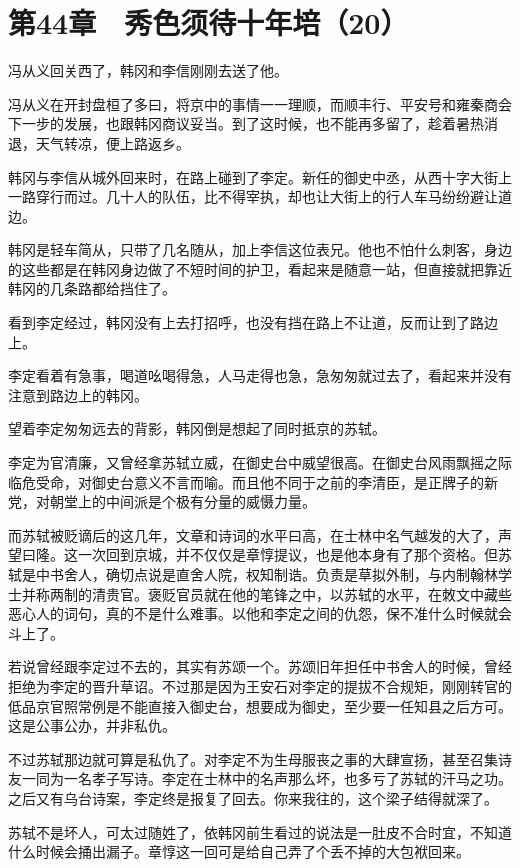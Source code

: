 \section{第44章　秀色须待十年培（20）}

冯从义回关西了，韩冈和李信刚刚去送了他。

冯从义在开封盘桓了多曰，将京中的事情一一理顺，而顺丰行、平安号和雍秦商会下一步的发展，也跟韩冈商议妥当。到了这时候，也不能再多留了，趁着暑热消退，天气转凉，便上路返乡。

韩冈与李信从城外回来时，在路上碰到了李定。新任的御史中丞，从西十字大街上一路穿行而过。几十人的队伍，比不得宰执，却也让大街上的行人车马纷纷避让道边。

韩冈是轻车简从，只带了几名随从，加上李信这位表兄。他也不怕什么刺客，身边的这些都是在韩冈身边做了不短时间的护卫，看起来是随意一站，但直接就把靠近韩冈的几条路都给挡住了。

看到李定经过，韩冈没有上去打招呼，也没有挡在路上不让道，反而让到了路边上。

李定看着有急事，喝道吆喝得急，人马走得也急，急匆匆就过去了，看起来并没有注意到路边上的韩冈。

望着李定匆匆远去的背影，韩冈倒是想起了同时抵京的苏轼。

李定为官清廉，又曾经拿苏轼立威，在御史台中威望很高。在御史台风雨飘摇之际临危受命，对御史台意义不言而喻。而且他不同于之前的李清臣，是正牌子的新党，对朝堂上的中间派是个极有分量的威慑力量。

而苏轼被贬谪后的这几年，文章和诗词的水平曰高，在士林中名气越发的大了，声望曰隆。这一次回到京城，并不仅仅是章惇提议，也是他本身有了那个资格。但苏轼是中书舍人，确切点说是直舍人院，权知制诰。负责是草拟外制，与内制翰林学士并称两制的清贵官。褒贬官员就在他的笔锋之中，以苏轼的水平，在敇文中藏些恶心人的词句，真的不是什么难事。以他和李定之间的仇怨，保不准什么时候就会斗上了。

若说曾经跟李定过不去的，其实有苏颂一个。苏颂旧年担任中书舍人的时候，曾经拒绝为李定的晋升草诏。不过那是因为王安石对李定的提拔不合规矩，刚刚转官的低品京官照常例是不能直接入御史台，想要成为御史，至少要一任知县之后方可。这是公事公办，并非私仇。

不过苏轼那边就可算是私仇了。对李定不为生母服丧之事的大肆宣扬，甚至召集诗友一同为一名孝子写诗。李定在士林中的名声那么坏，也多亏了苏轼的汗马之功。之后又有乌台诗案，李定终是报复了回去。你来我往的，这个梁子结得就深了。

苏轼不是坏人，可太过随姓了，依韩冈前生看过的说法是一肚皮不合时宜，不知道什么时候会捅出漏子。章惇这一回可是给自己弄了个丢不掉的大包袱回来。

